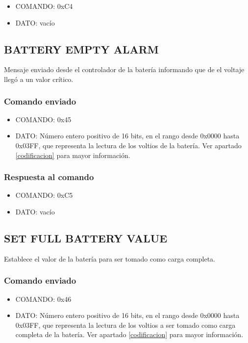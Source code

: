 \documentclass[a4paper,10pt]{article}
\begin{document}
\begin{itemize}
	\item{COMANDO:} 0xC4
	\item{DATO:} vac\'io
\end{itemize}

\subsection{BATTERY EMPTY ALARM}
\label{battery_empty}

Mensaje enviado desde el controlador de la bater\'ia informando que de el voltaje lleg\'o a un valor cr\'itico.

\subsubsection*{Comando enviado}

\begin{itemize}
	\item{COMANDO:} 0x45
	\item{DATO:} N\'umero entero positivo de 16 bits, en el rango desde 0x0000 hasta 0x03FF, que representa la lectura de los voltios de la bater\'ia.
		Ver apartado \ref{codificacion} para mayor informaci\'on.
\end{itemize}

\subsubsection*{Respuesta al comando}

\begin{itemize}
	\item{COMANDO:} 0xC5
	\item{DATO:} vac\'io
\end{itemize}

\subsection{SET FULL BATTERY VALUE}
\label{set_battery_empty_value}

Establece el valor de la bater\'ia para ser tomado como carga completa.

\subsubsection*{Comando enviado}

\begin{itemize}
	\item{COMANDO:} 0x46
	\item{DATO:} N\'umero entero positivo de 16 bits, en el rango desde 0x0000 hasta 0x03FF,
		que representa la lectura de los voltios a ser tomado como carga completa de la bater\'ia.
		Ver apartado \ref{codificacion} para mayor informaci\'on.
\end{itemize}
\end{document}
